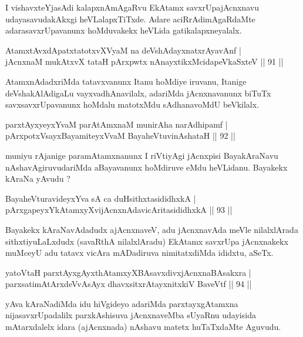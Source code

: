 \begin{artha}
I vishavxteYjasAdi kalapxnAmAgaRvu EkAtamx savxrUpajAcnxnavu udayasavudakAkxgi heVLalapxTiTxde. Adare aciRrAdimAgaRdaMte adarasavxrUpavanunx hoMduvakekx heVLida gatikalapxneyalalx.
\end{artha}

\begin{shl}
AtamxtAvxdApatxtatotxvXV\s yaM na deVshAdayxnatxrAyavAnf |\\
jAcnxnaM mukAtxvX tataH pArxpwtx nAnayxtikxMcidapeVkaSxteV \hfill || 91 || 
\end{shl}

\begin{artha}
AtamxnAdadxriMda tatavxvanunx Itanu hoMdiye iruvanu, Itanige deVshakAlAdigaLu vayxvadhAnavilalx, adariMda jAcnxnavanunx biTuTx savxsavxrUpavanunx hoMdalu matotxMdu sAdhanavoMdU beVkilalx.
\end{artha}

\begin{shl}
parxtAyxyeyxYvaM parAtAmxnaM munirAha narAdhipamf |\\
pArxpotxV\s sayxBayamiteyxVvaM BayaheVtuvinAshataH \hfill || 92 || 
\end{shl}

\begin{artha}
muniyu rAjanige paramAtamxnanunx I riVtiyAgi jAcnxpisi BayakAraNavu nAshavAgiruvudariMda aBayavanunx hoMdiruve eMdu heVLidanu. Bayakekx kAraNa yAvudu ?
\end{artha}

\begin{shl}
BayaheVturavideyxYva sA ca duHsithxtasididhxkA |\\
pArxgapeyxYkAtamxyXvijAcnxnAdavicAritasididhxkA \hfill || 93 || 
\end{shl}

\begin{artha}
Bayakekx kAraNavAdadudx ajAcnxnaveV, adu jAcnxnavAda meVle nilalxlArada sithxtiyuLaLxdudx (savaRthA nilalxlAradu) EkAtamx savxrUpa jAcnxnakekx muMceyU adu tatavx vicAra mADadiruva nimitatxdiMda ididxtu, aSeTx.
\end{artha}

\begin{shl}
yatoV\s taH parxtAyxgAyxthAtamxyXBAsavxdivxjAcnxnaBAsakxra |\\
parxsatimAtArxdeVvAsAyx dhavxsitxrAtayxnitxkiV BaveVtf \hfill || 94 || 
\end{shl}

\begin{artha}
yAva kAraNadiMda idu hiVgideyo adariMda parxtayxgAtamxna nijasavxrUpadalilx parxkAshisuva jAcnxnaveMba sUyaRnu udayisida mAtarxdalelx idara (ajAcnxnada) nAshavu matetx huTaTxdaMte Aguvudu.
\end{artha}

